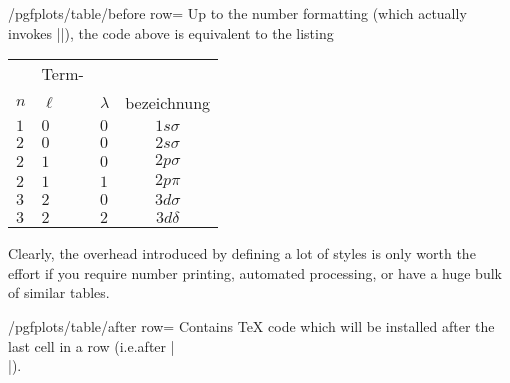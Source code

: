 \begin{key}{/pgfplots/table/before row=}
    Up to the number formatting (which actually invokes |\pgfmathprintnumber|),
    the code above is equivalent to the listing
\begin{codeexample}
\begin{tabular}{|C|C|C|c|}
\hline
{}  & Term-\\
 $n$ & $\ell$ & $\lambda$ & bezeichnung\\
\hline
$1$ & $0$ & $0$ & $1 s\sigma$ \\
$2$ & $0$ & $0$ & $2 s\sigma$ \\
$2$ & $1$ & $0$ & $2 p\sigma$ \\
$2$ & $1$ & $1$ & $2 p \pi$ \\
$3$ & $2$ & $0$ & $3 d\sigma$ \\
$3$ & $2$ & $2$ & $3 d\delta$ \\
\hline
\end{tabular}
\end{codeexample}

    Clearly, the overhead introduced by defining a lot of styles is only worth
    the effort if you require number printing, automated processing, or have a
    huge bulk of similar tables.
\end{key}

\begin{key}{/pgfplots/table/after row=}
    Contains \TeX{} code which will be installed after the last cell in a row
    (i.e.\@ after |\\|).
\end{key}

